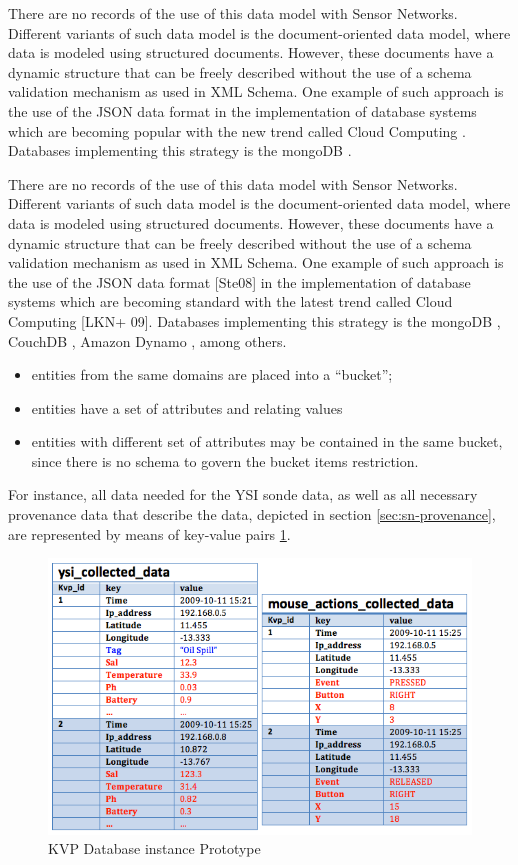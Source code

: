 There are no records of the use of this data model with Sensor Networks.
Different variants of such data model is the document-oriented data model,
where data is modeled using structured documents. However, these documents
have a dynamic structure that can be freely described without the use of a
schema validation mechanism as used in XML Schema. One example of such
approach is the use of the JSON data format \cite{json} in the implementation
of database systems which are becoming popular with the new trend called Cloud
Computing \cite{cloud-comp-architectures}. Databases implementing this
strategy is the mongoDB .

There are no records of the use of this data model with Sensor Networks.
Different variants of such data model is the document-oriented data model,
where data is modeled using structured documents. However, these documents have
a dynamic structure that can be freely described without the use of a schema
validation mechanism as used in XML Schema. One example of such approach is the
use of the JSON data format [Ste08] in the implementation of database systems
which are becoming standard with the latest trend called Cloud Computing [LKN+
09]. Databases implementing this strategy is the mongoDB \cite{mongodb},
CouchDB \cite{couchdb}, Amazon Dynamo \cite{db-kvp}, among others.

\begin{itemize}
  \item entities from the same domains are placed into a ``bucket'';
  \item entities have a set of attributes and relating values
  \item entities with different set of attributes may be contained in the same
  bucket, since there is no schema to govern the bucket items restriction.
\end{itemize}

For instance, all data needed for the YSI sonde data, as well as all necessary
provenance data that describe the data, depicted in section
\ref{sec:sn-provenance}, are represented by means of key-value pairs
\ref{fig:persistence-example-kvp}.

\begin{figure}[!h]
  \centering
  \includegraphics[scale=0.75]{../diagrams/persistence-example-kvp}
  \caption{KVP Database instance Prototype}
  \label{fig:persistence-example-kvp}
\end{figure}

